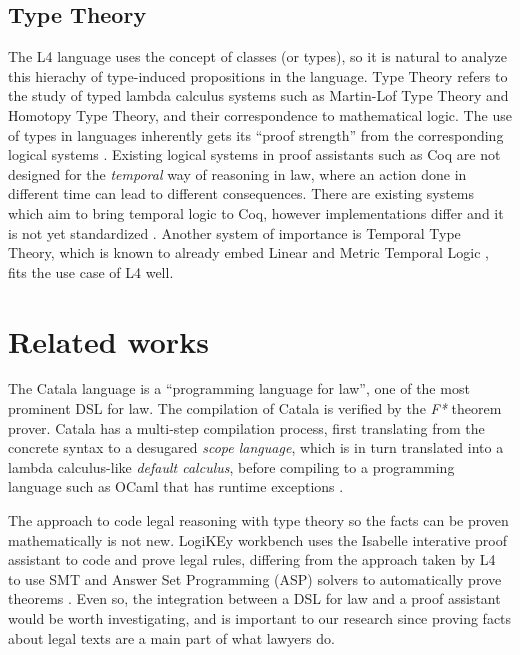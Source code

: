 \documentclass[11pt, sigconf]{acmart}
\begin{document}
\subsection{Type Theory}
\label{subsec:tt}
The L4 language uses the concept of classes (or types), so it is natural to
analyze this hierachy of type-induced propositions in the language. Type Theory
refers to the study of typed lambda calculus systems such as Martin-Lof Type
Theory and Homotopy Type Theory, and their correspondence to mathematical logic.
The use of types in languages inherently gets its ``proof strength'' from the
corresponding logical systems \cite{sep-type-theory}. Existing logical systems
in proof assistants such as Coq are not designed for the \emph{temporal} way of
reasoning in law, where an action done in different time can lead to different
consequences. There are existing systems which aim to bring temporal logic to
Coq, however implementations differ and it is not yet standardized
\cite{notbad4u_2019, gmalecha_2015}. Another system of importance is Temporal
Type Theory, which is known to already embed Linear and Metric Temporal Logic
\cite{schultz2017temporal}, fits the use case of L4 well.

\section{Related works}
\label{sec:related}
The Catala language \cite{merigoux2021catala} is a ``programming language for
law'', one of the most prominent DSL for law. The compilation of Catala is
verified by the \emph{F*} theorem prover. Catala has a multi-step compilation
process, first translating from the concrete syntax to a desugared \emph{scope
  language}, which is in turn translated into a lambda calculus-like
\emph{default calculus}, before compiling to a programming language such as
OCaml that has runtime exceptions \cite{merigoux2021catala}.

The approach to code legal reasoning with type theory so the facts can be proven
mathematically is not new. LogiKEy workbench \cite{logikey} uses the Isabelle
interative proof assistant to code and prove legal rules, differing from the
approach taken by L4 to use SMT and Answer Set Programming (ASP) solvers to
automatically prove theorems \cite{smucclaw}. Even so, the integration between a
DSL for law and a proof assistant would be worth investigating, and is important
to our research since proving facts about legal texts are a main part of what
lawyers do.
\end{document}
